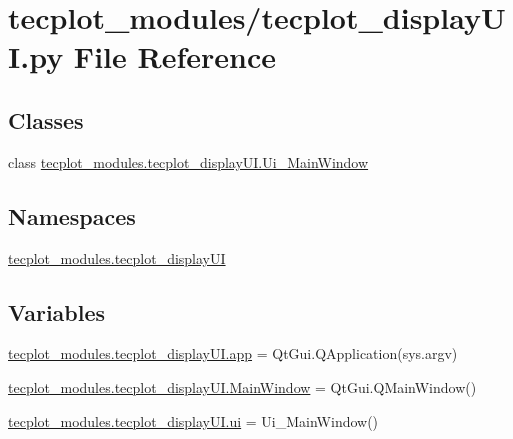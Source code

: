 \hypertarget{a00326}{}\section{tecplot\+\_\+modules/tecplot\+\_\+display\+UI.py File Reference}
\label{a00326}
\subsection*{Classes}
\begin{DoxyCompactItemize}
\item 
class \hyperlink{a00114}{tecplot\+\_\+modules.\+tecplot\+\_\+display\+U\+I.\+Ui\+\_\+\+Main\+Window}
\end{DoxyCompactItemize}
\subsection*{Namespaces}
\begin{DoxyCompactItemize}
\item 
 \hyperlink{a00064}{tecplot\+\_\+modules.\+tecplot\+\_\+display\+UI}
\end{DoxyCompactItemize}
\subsection*{Variables}
\begin{DoxyCompactItemize}
\item 
\hyperlink{a00064_af6c75ceae00a9a5ef4b5025551b09205}{tecplot\+\_\+modules.\+tecplot\+\_\+display\+U\+I.\+app} = Qt\+Gui.\+Q\+Application(sys.\+argv)
\item 
\hyperlink{a00064_a05b56eca3c779fabf41fa975030e6ca1}{tecplot\+\_\+modules.\+tecplot\+\_\+display\+U\+I.\+Main\+Window} = Qt\+Gui.\+Q\+Main\+Window()
\item 
\hyperlink{a00064_aa95df04768ef9b320020d0084673133a}{tecplot\+\_\+modules.\+tecplot\+\_\+display\+U\+I.\+ui} = Ui\+\_\+\+Main\+Window()
\end{DoxyCompactItemize}
